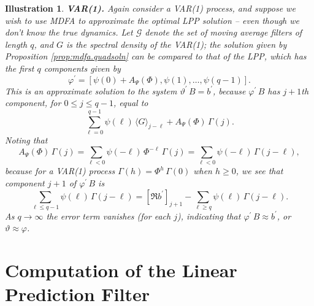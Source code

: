 \documentclass[a4paper]{book}
\def\tends{\rightarrow}
\newtheorem{Illustration}{Illustration}
\begin{document}
\begin{Illustration} {\bf VAR(1).}  \rm
\label{ill:var1.3}
 Again consider a VAR(1) process,
 and suppose we wish to use MDFA to approximate the optimal LPP
 solution -- even though we don't know the true dynamics.
   Let $\mathcal{G}$ denote the set of moving average filters of
 length $q$, and $G$ is the spectral density of the VAR(1);
  the solution given by Proposition \ref{prop:mdfa.quadsoln}
 can be compared to that of the LPP, which has the first $q$ components
 given by
\[
 \varphi^{\prime} = [ \psi (0) + A_{\Psi} (\Phi), \psi (1),
 \ldots, \psi (q-1)].
\]
 This is an approximate solution to the system $\vartheta^{\prime} \, B
 =  b^{\prime}$, because
 $  \varphi^{\prime} \, B $ has $j+1$th component, for $0 \leq j \leq q-1$,
 equal to
\[
   \sum_{\ell=0}^{q-1} \psi (\ell) \, {\langle G \rangle }_{j-\ell}
 + A_{\Psi} (\Phi) \, \Gamma (j).
\]
  Noting that
\[
 A_{\Psi} (\Phi) \, \Gamma (j)
 = \sum_{\ell < 0 } \psi (-\ell) \, \Phi^{-\ell} \, \Gamma (j)
 = \sum_{\ell < 0} \psi (-\ell) \, \Gamma (j- \ell),
\]
 because for a VAR(1) process $\Gamma (h) = \Phi^h \, \Gamma (0)$ when
 $h \geq 0$, we see that component $j+1$ of $\varphi^{\prime} \, B$ is
\[
  \sum_{\ell \leq q-1} \psi (\ell) \, \Gamma (j-\ell)
  =  {[ \Re b^{\prime} ]}_{j+1} - \sum_{\ell \geq q} \psi (\ell) \, \Gamma (j-\ell).
\]
 As $q \tends \infty$ the error term vanishes (for each $j$), indicating
 that $\varphi^{\prime} \, B \approx  b^{\prime}$, or
 $\vartheta \approx \varphi$.
\end{Illustration}
 

\section{Computation of the Linear Prediction Filter}
\end{document}
